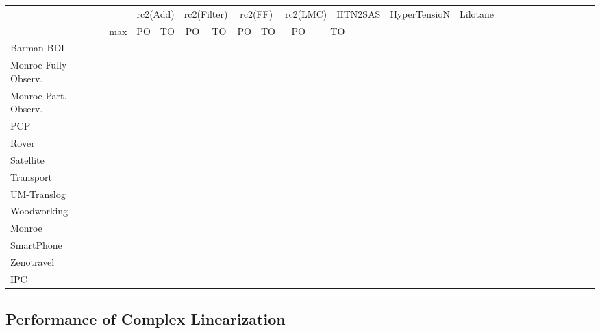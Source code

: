 \documentclass[letterpaper]{article}
\begin{document}
\begin{table}[h]
	\scalebox{0.45} {
		\begin{tabular}{lccccccccccccccccccccccccl} 
			\toprule 
			&& \multicolumn{2}{c}{rc2(Add)} & \multicolumn{2}{c}{rc2(Filter)} & \multicolumn{2}{c}{rc2(FF)} & \multicolumn{2}{c}{rc2(LMC)}  & \multicolumn{2}{c}{HTN2SAS} & \multicolumn{2}{c}{HyperTensioN} & \multicolumn{2}{c}{Lilotane} \\ 
			\cmidrule(lr){3-4} \cmidrule(lr){5-6} \cmidrule(lr){7-8} \cmidrule(lr){9-10} \cmidrule(lr){11-12}  \cmidrule(lr){13-14} \cmidrule(lr){15-16}    
			& max &PO & TO & PO & TO & PO & TO & PO &\multicolumn{2}{c}{ TO  }   \\ 
			\midrule 
			Barman-BDI  \\ 
			Monroe Fully Observ. \\ 
			Monroe Part. Observ. \\ 
			PCP\\ 
			Rover  \\ 
			Satellite  \\ 
			Transport \\ 
			UM-Translog \\ 
			Woodworking \\ 
			\midrule 
			Monroe  \\ 
			SmartPhone \\ 
			Zenotravel \\ 
			\midrule 
			IPC \\
			\bottomrule
			\end{tabular} 	
	}
\end{table}


\subsection{Performance of Complex Linearization}
\end{document}
